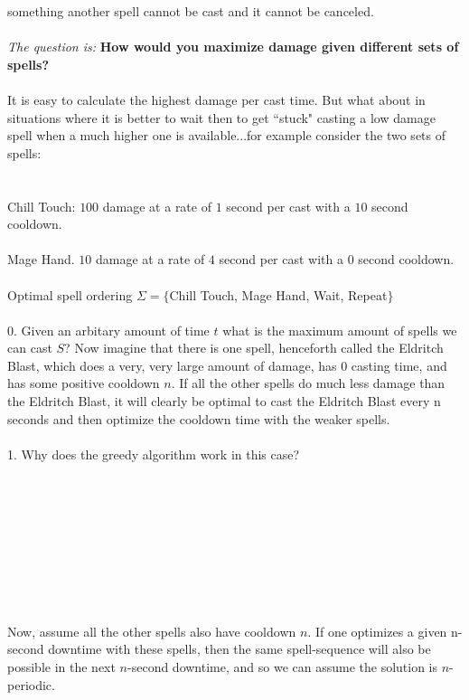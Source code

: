 \documentclass[12pt]{article}
\begin{document}
something another spell cannot be cast and 
it cannot be canceled. \\\\
\textit{The question is:} \textbf{How would you maximize damage 
given different sets of spells?} \\\\
It is easy to calculate the highest damage per cast 
time. But what about in situations where it is better 
to wait then to get ``stuck" casting a low damage 
spell when a much higher one is available...for example consider
the two sets of spells:\\\\\\
Chill Touch: $100$ damage at a rate of $1$ second per cast with a $10$ second cooldown. \\\\
Mage Hand. $10$ damage at a rate of $4$ second per cast with a $0$ second cooldown.\\\\
Optimal spell ordering $\Sigma =\{$Chill Touch, Mage Hand, Wait, Repeat$\}$\\\\
0. Given an arbitary amount of time $t$ what is the maximum amount of spells
we can cast $S$?
\newpage
\noindent Now imagine that there is one spell, henceforth called the Eldritch Blast, 
which does a very, very large amount of damage, has $0$ casting time, and has 
some positive cooldown $n$. If all the other spells do much less damage than the 
Eldritch Blast, it will clearly be optimal to cast the Eldritch Blast every n seconds and 
then optimize the cooldown time with the weaker spells.\\\\
1. Why does the greedy algorithm work in this case?\\\\\\\\\\\\\\\\\\\\
Now, assume all the other spells also have cooldown $n$. 
If one optimizes a given n-second downtime with these spells, 
then the same spell-sequence will also be possible in the next 
$n$-second downtime, and so we can assume the solution is $n$-periodic.\\\\
\end{document}
